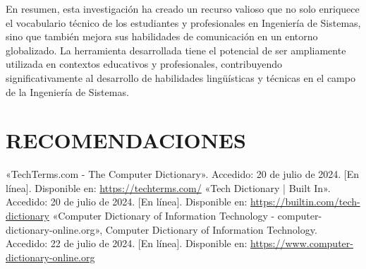 En resumen, esta investigación ha creado un recurso valioso que no solo enriquece el vocabulario técnico de los estudiantes y profesionales en Ingeniería de Sistemas, sino que también mejora sus habilidades de comunicación en un entorno globalizado. La herramienta desarrollada tiene el potencial de ser ampliamente utilizada en contextos educativos y profesionales, contribuyendo significativamente al desarrollo de habilidades lingüísticas y técnicas en el campo de la Ingeniería de Sistemas.
\section{RECOMENDACIONES}

\clearpage
\begin{thebibliography}{X}
     «TechTerms.com - The Computer Dictionary». Accedido: 20 de julio de 2024. [En línea]. Disponible en: \url{https://techterms.com/}
     «Tech Dictionary | Built In». Accedido: 20 de julio de 2024. [En línea]. Disponible en: \url{https://builtin.com/tech-dictionary}
     «Computer Dictionary of Information Technology - computer-dictionary-online.org», Computer Dictionary of Information Technology. Accedido: 22 de julio de 2024. [En línea]. Disponible en: \url{https://www.computer-dictionary-online.org}

\end{thebibliography}
